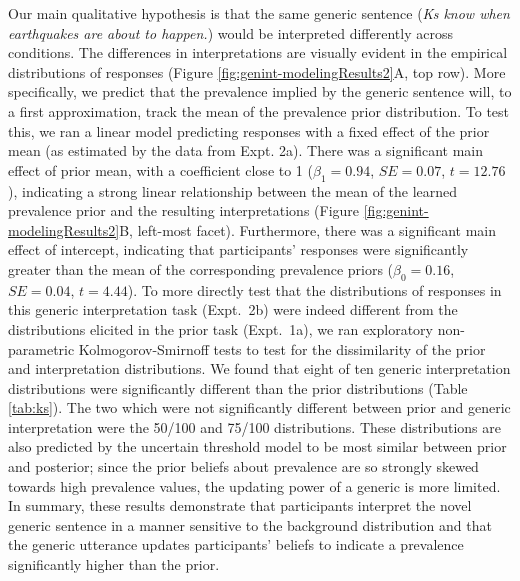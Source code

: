 \documentclass[floatsintext,doc]{apa6}
\begin{document}
Our main qualitative hypothesis is that the same generic sentence (\emph{Ks know when earthquakes are about to happen.}) would be interpreted differently across conditions.
The differences in interpretations are visually evident in the empirical distributions of responses (Figure \ref{fig:genint-modelingResults2}A, top row).
More specifically, we predict that the prevalence implied by the generic sentence will, to a first approximation, track the mean of the prevalence prior distribution.
To test this, we ran a linear model predicting responses with a fixed effect of the prior mean (as estimated by the data from Expt. 2a).
There was a significant main effect of prior mean, with a coefficient close to 1 (\(\beta_1 = 0.94\), \(SE=0.07\), \(t = 12.76\)), indicating a strong linear relationship between the mean of the learned prevalence prior and the resulting interpretations (Figure \ref{fig:genint-modelingResults2}B, left-most facet).
Furthermore, there was a significant main effect of intercept, indicating that participants' responses were significantly greater than the mean of the corresponding prevalence priors (\(\beta_0 = 0.16\), \(SE=0.04\), \(t = 4.44\)).
To more directly test that the distributions of responses in this generic interpretation task (Expt.~2b) were indeed different from the distributions elicited in the prior task (Expt.~1a), we ran exploratory non-parametric Kolmogorov-Smirnoff tests to test for the dissimilarity of the prior and interpretation distributions.  
We found that eight of ten generic interpretation distributions were significantly different than the prior distributions (Table \ref{tab:ks}).
The two which were not significantly different between prior and generic interpretation were the 50/100 and 75/100 distributions. These distributions are also predicted by the uncertain threshold model to be most similar between prior and posterior; since the prior beliefs about prevalence are so strongly skewed towards high prevalence values, the updating power of a generic is more limited.
In summary, these results demonstrate that participants interpret the novel generic sentence in a manner sensitive to the background distribution and that the generic utterance updates participants' beliefs to indicate a prevalence significantly higher than the prior.
\end{document}
